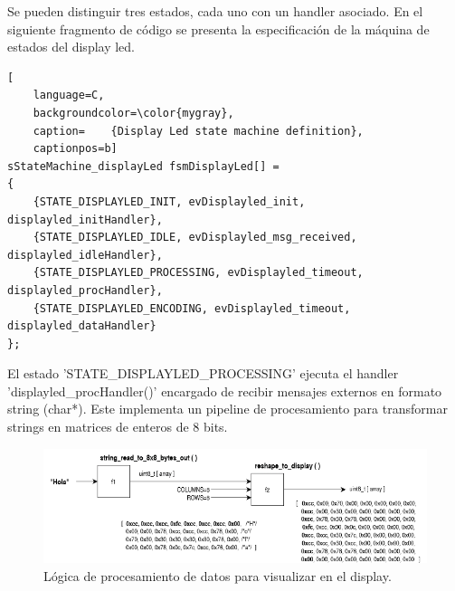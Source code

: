 Se pueden distinguir tres estados, cada uno con un handler asociado. En el siguiente fragmento de código se presenta la especificación de la máquina de estados del display led. \\


\begin{lstlisting}[
	language=C, 
	backgroundcolor=\color{mygray},
	caption=	{Display Led state machine definition},
	captionpos=b]
sStateMachine_displayLed fsmDisplayLed[] = 
{
    {STATE_DISPLAYLED_INIT, evDisplayled_init, displayled_initHandler},
    {STATE_DISPLAYLED_IDLE, evDisplayled_msg_received, displayled_idleHandler},
    {STATE_DISPLAYLED_PROCESSING, evDisplayled_timeout, displayled_procHandler},
    {STATE_DISPLAYLED_ENCODING, evDisplayled_timeout, displayled_dataHandler}
};
\end{lstlisting}
\label{code:fsmDisplay}

El estado 'STATE\_DISPLAYLED\_PROCESSING' ejecuta el handler  'displayled\_procHandler()' encargado de recibir mensajes externos en formato string (char*). Este implementa un pipeline de procesamiento para transformar strings en matrices de enteros de 8 bits.



\begin{figure}[ht]
	\centering
	\includegraphics[width=1\textwidth]{./Figures/pipelineDataEncoding.png}
	\caption{Lógica de procesamiento de datos para visualizar en el display.}
	\label{fig:displayDataLogic}
\end{figure}


